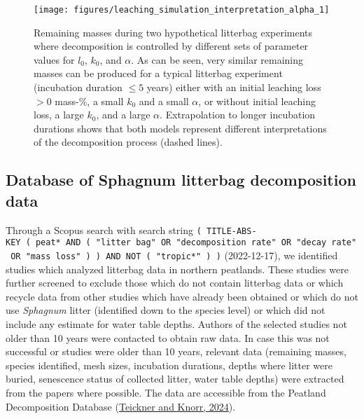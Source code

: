 \documentclass[
  12pt,
]{article}
\begin{document}
\begin{figure}[H]

{\centering \texttt{[image: figures/leaching\_simulation\_interpretation\_alpha\_1]} 

}

\caption{Remaining masses during two hypothetical litterbag experiments where decomposition is controlled by different sets of parameter values for \(l_0\), \(k_0\), and \(\alpha\). As can be seen, very similar remaining masses can be produced for a typical litterbag experiment (incubation duration \(\le5\) years) either with an initial leaching loss \(>0\) mass-\%, a small \(k_0\) and a small \(\alpha\), or without initial leaching loss, a large \(k_0\), and a large \(\alpha\). Extrapolation to longer incubation durations shows that both models represent different interpretations of the decomposition process (dashed lines).}\label{fig:out-leaching-sim-interpretation-alpha}
\end{figure}

\hypertarget{database-of-sphagnum-litterbag-decomposition-data}{%
\subsection{Database of Sphagnum litterbag decomposition data}\label{database-of-sphagnum-litterbag-decomposition-data}}

Through a Scopus search with search string \texttt{(\ TITLE-ABS-KEY\ (\ peat*\ AND\ (\ "litter\ bag"\ OR\ "decomposition\ rate"\ OR\ "decay\ rate"\ OR\ "mass\ loss"\ )\ )\ AND\ NOT\ (\ "tropic*"\ )\ )} (2022-12-17), we identified studies which analyzed litterbag data in northern peatlands. These studies were further screened to exclude those which do not contain litterbag data or which recycle data from other studies which have already been obtained or which do not use \emph{Sphagnum} litter (identified down to the species level) or which did not include any estimate for water table depths. Authors of the selected studies not older than 10 years were contacted to obtain raw data. In case this was not successful or studies were older than 10 years, relevant data (remaining masses, species identified, mesh sizes, incubation durations, depths where litter were buried, senescence status of collected litter, water table depths) were extracted from the papers where possible. The data are accessible from the Peatland Decomposition Database (\protect\hyperlink{ref-Teickner.2024c}{Teickner and Knorr, 2024}).
\end{document}
